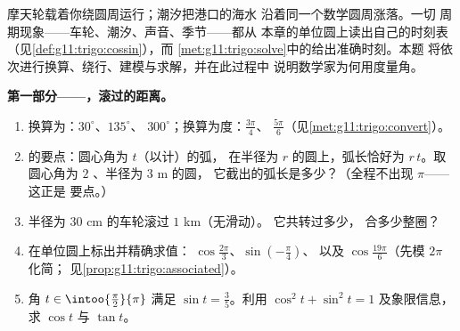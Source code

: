 \begin{problem}
\label{pb:g11:trigo:1}
摩天轮载着你绕圆周运行；潮汐把港口的海水
沿着同一个数学圆周涨落。一切
周期现象——车轮、潮汐、声音、季节——都从
本章的单位圆上读出自己的时刻表
（见\cref{def:g11:trigo:cossin}），而
\cref{met:g11:trigo:solve}中的给出准确时刻。本题
将依次进行换算、绕行、建模与求解，并在此过程中
说明数学家为何用度量角。

\medskip
\noindent\textbf{第一部分——，滚过的距离。}
\begin{enumerate}
  \item 换算为：$30^\circ$、$135^\circ$、
        $300^\circ$；换算为度：$\frac{3\pi}{4}$、
        $\frac{5\pi}{6}$（见\cref{met:g11:trigo:convert}）。
  \item {}的要点：圆心角为 $t$（以计）的弧，
        在半径为 $r$ 的圆上，弧长恰好为
        $r\,t$。取圆心角为 $2$ 、半径为 $3$ m 的圆，
        它截出的弧长是多少？（全程不出现 $\pi$——这正是
        要点。）
  \item 半径为 $30$ cm 的车轮滚过 $1$ km（无滑动）。
        它共转过多少\emph{}，
        合多少整圈？
  \item 在单位圆上标出并精确求值：
        $\cos\frac{2\pi}{3}$、$\sin\left(-\frac{\pi}{4}\right)$、
        以及 $\cos\frac{19\pi}{6}$（先模 $2\pi$ 化简；
        见\cref{prop:g11:trigo:associated}）。
  \item 角 $t \in \intoo{\frac\pi2}{\pi}$ 满足
        $\sin t = \frac35$。利用
        $\cos^2 t + \sin^2 t = 1$ 及象限信息，求
        $\cos t$ 与 $\tan t$。
\end{enumerate}


\end{problem}
